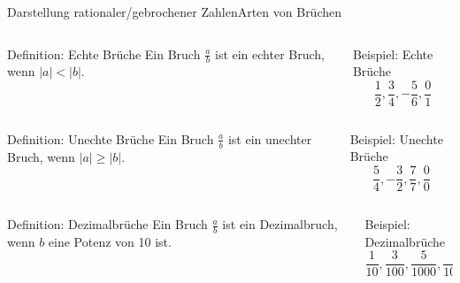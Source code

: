 \documentclass[xelatex,aspectratio=169]{beamer}
\begin{document}
\begin{frame}{Darstellung rationaler/gebrochener Zahlen}{Arten von Brüchen}
  \begin{columns}
    \begin{column}{0.5\textwidth}
      \begin{block}{Definition: Echte Brüche}
        Ein Bruch $\frac{a}{b}$ ist ein echter Bruch, wenn $|a| < |b|$.\\~
      \end{block}
    \end{column}
    \begin{column}{0.5\textwidth}
      \begin{exampleblock}{Beispiel: Echte Brüche}
        \[
          \frac{1}{2}, \frac{3}{4}, -\frac{5}{6}, \frac{0}{1}
        \]
      \end{exampleblock}
    \end{column}
  \end{columns}
  \begin{columns}
    \begin{column}{0.5\textwidth}
      \begin{block}{Definition: Unechte Brüche}
        Ein Bruch $\frac{a}{b}$ ist ein unechter Bruch, wenn $|a| \geq |b|$.
      \end{block}
    \end{column}
    \begin{column}{0.5\textwidth}
      \begin{exampleblock}{Beispiel: Unechte Brüche}
        \[
          \frac{5}{4}, -\frac{3}{2}, \frac{7}{7}, \frac{0}{0}
        \]

      \end{exampleblock}
    \end{column}
  \end{columns}
  \begin{columns}
    \begin{column}{0.5\textwidth}
      \begin{block}{Definition: Dezimalbrüche}
        Ein Bruch $\frac{a}{b}$ ist ein Dezimalbruch, wenn $b$ eine Potenz von 10 ist.
      \end{block}
    \end{column}
    \begin{column}{0.5\textwidth}
      \begin{exampleblock}{Beispiel: Dezimalbrüche}
        \[
          \frac{1}{10}, \frac{3}{100}, \frac{5}{1000}, \frac{7}{10000}
        \]

      \end{exampleblock}
    \end{column}
  \end{columns}
\end{frame}
\end{document}
